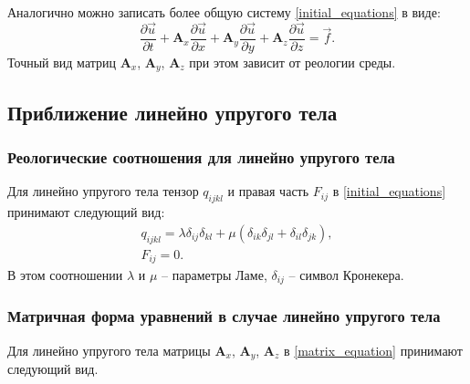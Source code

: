 Аналогично можно записать более общую систему \ref{initial_equations} в виде:
\begin{equation}
\label{matrix_equation}
\frac{\partial\vec{u}}{\partial{t}}+\mathbf{A}_x\frac{\partial\vec{u}}{\partial{x}}+
\mathbf{A}_y\frac{\partial\vec{u}}{\partial{y}}+
\mathbf{A}_z\frac{\partial\vec{u}}{\partial{z}}=\vec{f}.
\end{equation}
Точный вид матриц $\mathbf{A}_x$, $\mathbf{A}_y$, $\mathbf{A}_z$ при этом зависит от реологии среды.

\clearpage
\newpage

\subsection{Приближение линейно упругого тела}

\subsubsection{Реологические соотношения для линейно упругого тела}

Для линейно упругого тела тензор $q_{ijkl}$ и правая часть $F_{ij}$ в \ref{initial_equations} принимают следующий вид:
\begin{eqnarray}
\label{tensor_qijkl_elastic}
q_{ijkl}=\lambda\delta_{ij}\delta_{kl}+\mu(\delta_{ik}\delta_{jl}+\delta_{il}
\delta_{jk}),\nonumber\\
F_{ij}=0.
\end{eqnarray}
В этом соотношении $\lambda$ и $\mu$ -- параметры Ламе, $\delta_{ij}$ -- символ Кронекера.

\subsubsection{Матричная форма уравнений в случае линейно упругого тела}

Для линейно упругого тела матрицы $\mathbf{A}_x$, $\mathbf{A}_y$, $\mathbf{A}_z$ в \ref{matrix_equation} принимают следующий вид.

